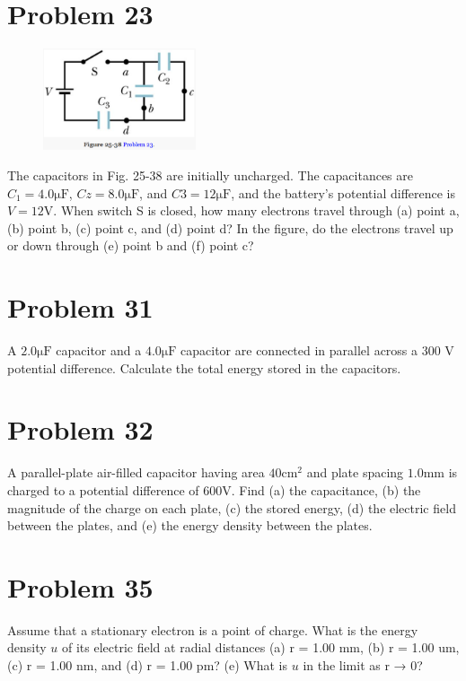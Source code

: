 \documentclass[12pt]{article}
\begin{document}
\section{Problem 23}
\begin{figure}
    \vspace{-30pt}
    \includegraphics[width=0.4\textwidth]{picture_6.png} 
\end{figure}
The capacitors in Fig. 25-38 are initially uncharged. 
The capacitances are $C_1 = 4.0 \unit{\micro\farad}$, $Cz = 8.0 \unit{\micro\farad}$, and $C3 = 12 \unit{\micro\farad}$, and the battery's potential difference is $V = 12 \unit{\volt}$. 
When switch S is closed, how many electrons travel through (a) point a, (b) point b, (c) point c, and (d) point d? 
In the figure, do the electrons travel up or down through (e) point b and (f) point c?

\pagebreak
\section{Problem 31}
A $2.0 \unit{\micro\farad}$ capacitor and a $4.0 \unit{\micro\farad}$ capacitor are connected in parallel across a 300 V potential difference.
Calculate the total energy stored in the capacitors.

\pagebreak
\section{Problem 32}
A parallel-plate air-filled capacitor having area $40\unit{\centi\meter^2}$ and plate spacing $1.0 \unit{\milli\meter}$ is charged to a potential difference of $600 \unit{\volt}$. 
Find (a) the capacitance, (b) the magnitude of the charge on each plate, (c) the stored energy, (d) the electric field between the plates, and (e) the energy density between the plates.

\pagebreak
\section{Problem 35}
Assume that a stationary electron is a point of charge. 
What is the energy density $u$ of its electric field at radial distances (a) r = 1.00 mm, (b) r = 1.00 um, (c) r = 1.00 nm, and (d) r = 1.00 pm? 
(e) What is $u$ in the limit as r → 0?
\end{document}
